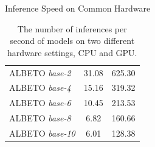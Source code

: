 \documentclass[aspectratio=169,xcolor=dvipsnames]{beamer}
\begin{document}
\begin{frame}{Inference Speed on Common Hardware}
\begin{table}[]
\begin{center}
{\begin{tabular}{lcc}
ALBETO \textit{base-2}                                       & 31.08               & 625.30              \\
ALBETO \textit{base-4}                                       & 15.16               & 319.32              \\
ALBETO \textit{base-6}                                       & 10.45               & 213.53              \\
ALBETO \textit{base-8}                                       & 6.82                & 160.66              \\
ALBETO \textit{base-10}                                      & 6.01                & 128.38              \\ \hline
\end{tabular}}
\end{center}
\caption{The number of inferences per second of models on two different hardware settings, CPU and GPU.}
\label{table:inferences-per-second}
\end{table}

\end{frame}
\end{document}
